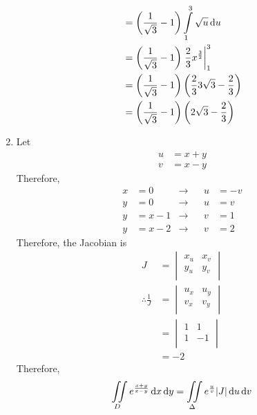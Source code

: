 \documentclass[fleqn, a4paper, 11pt, oneside]{amsart}
\theoremstyle{definition}
\theoremstyle{theorem}
\begin{document}
\begin{solution}
\begin{enumerate}[leftmargin = *]
\begin{align*}
                                                                 & = \left( \frac{1}{\sqrt{3}} - 1 \right) \int\limits_{1}^{3} \sqrt{u} \dif u                 \\
                                                                 & = \left( \frac{1}{\sqrt{3}} - 1 \right) \left. \frac{2}{3} x^{\frac{3}{2}} \right|_{1}^{3}  \\
                                                                 & = \left( \frac{1}{\sqrt{3}} - 1 \right) \left( \frac{2}{3} 3 \sqrt{3} - \frac{2}{3} \right) \\
                                                                 & = \left( \frac{1}{\sqrt{3}} - 1 \right) \left( 2 \sqrt{3} - \frac{2}{3} \right)
			\end{align*}
		\item
			Let
			\begin{align*}
				u & = x + y \\
				v & = x - y
			\end{align*}
			Therefore,
			\begin{align*}
				x & = 0     & \to &  & u & = -v \\
				y & = 0     & \to &  & u & = v  \\
				y & = x - 1 & \to &  & v & = 1  \\
				y & = x - 2 & \to &  & v & = 2
			\end{align*}
			Therefore, the Jacobian is
			\begin{align*}
				J &=
					\begin{vmatrix}
						x_u & x_v \\
						y_u & y_v \\
					\end{vmatrix}\\
				\therefore \frac{1}{J} &=
					\begin{vmatrix}
						u_x & u_y \\
						v_x & v_y \\
					\end{vmatrix}\\
				&=
					\begin{vmatrix}
						1 & 1  \\
						1 & -1 \\
					\end{vmatrix}\\
				&= -2
			\end{align*}
			Therefore,
			\begin{align*}
				\iint\limits_{D} e^{\frac{x + y}{x - y}} \dif x \dif y & = \iint\limits_{\Delta} e^{\frac{u}{v}} |J| \dif u \dif v                            \\

\end{align*}
\end{enumerate}
\end{solution}
\end{document}
